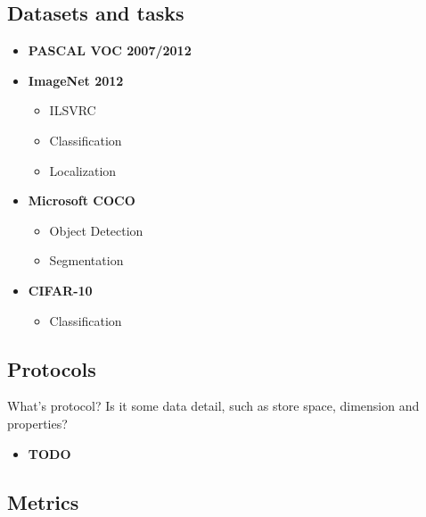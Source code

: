 

\subsection{Datasets and tasks}

\begin{itemize}
    \item \textbf{PASCAL VOC 2007/2012}

    \item \textbf{ImageNet 2012} 
        \begin{itemize}
            \item ILSVRC
            \item Classification
            \item Localization
        \end{itemize}

    \item \textbf{Microsoft COCO}
        \begin{itemize}
            \item Object Detection
            \item Segmentation
        \end{itemize}
    \item \textbf{CIFAR-10}
        \begin{itemize}
            \item Classification
        \end{itemize}


\end{itemize}

\subsection{Protocols}

What's protocol? Is it some data detail, such as store space, 
dimension and properties?

\begin{itemize}
    \item \textbf{TODO}
\end{itemize}


\subsection{Metrics}

